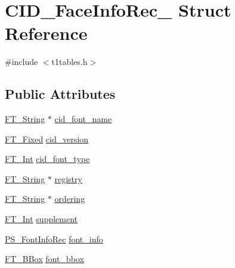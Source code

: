 \hypertarget{struct_c_i_d___face_info_rec__}{}\section{C\+I\+D\+\_\+\+Face\+Info\+Rec\+\_\+ Struct Reference}
\label{struct_c_i_d___face_info_rec__}


{\ttfamily \#include $<$t1tables.\+h$>$}

\subsection*{Public Attributes}
\begin{DoxyCompactItemize}
\item 
\mbox{\hyperlink{fttypes_8h_a9846214585359eb2ba6bbb0e6de30639}{F\+T\+\_\+\+String}} $\ast$ \mbox{\hyperlink{struct_c_i_d___face_info_rec___a804ff6d8a672236f258bfe7baf20867a}{cid\+\_\+font\+\_\+name}}
\item 
\mbox{\hyperlink{fttypes_8h_a5f5a679cc09f758efdd0d1c5feed3c3d}{F\+T\+\_\+\+Fixed}} \mbox{\hyperlink{struct_c_i_d___face_info_rec___af37ddd46827a8e45fbcce60f43e2f61c}{cid\+\_\+version}}
\item 
\mbox{\hyperlink{fttypes_8h_af90e5fb0d07e21be9fe6faa33f02484c}{F\+T\+\_\+\+Int}} \mbox{\hyperlink{struct_c_i_d___face_info_rec___a83ce2384925f2fec44a823cf635abe8c}{cid\+\_\+font\+\_\+type}}
\item 
\mbox{\hyperlink{fttypes_8h_a9846214585359eb2ba6bbb0e6de30639}{F\+T\+\_\+\+String}} $\ast$ \mbox{\hyperlink{struct_c_i_d___face_info_rec___a7f553f371d2c960b4c46876f748f5c0d}{registry}}
\item 
\mbox{\hyperlink{fttypes_8h_a9846214585359eb2ba6bbb0e6de30639}{F\+T\+\_\+\+String}} $\ast$ \mbox{\hyperlink{struct_c_i_d___face_info_rec___acbc231cd616375331c2c1a7bb31b2f87}{ordering}}
\item 
\mbox{\hyperlink{fttypes_8h_af90e5fb0d07e21be9fe6faa33f02484c}{F\+T\+\_\+\+Int}} \mbox{\hyperlink{struct_c_i_d___face_info_rec___a6d35a867d12ca9cfa6ab06cf329d0354}{supplement}}
\item 
\mbox{\hyperlink{t1tables_8h_aea24b6bd1ce2570170c42cfd8718895e}{P\+S\+\_\+\+Font\+Info\+Rec}} \mbox{\hyperlink{struct_c_i_d___face_info_rec___ab7a975d269f3d2bd16554d2c3c1ba05f}{font\+\_\+info}}
\item 
\mbox{\hyperlink{ftimage_8h_ae341c4eb5a7199947a13b2a1dcaf7af7}{F\+T\+\_\+\+B\+Box}} \mbox{\hyperlink{struct_c_i_d___face_info_rec___a48fe4e9246535f547241028cbf8d8b41}{font\+\_\+bbox}}

\end{DoxyCompactItemize}
